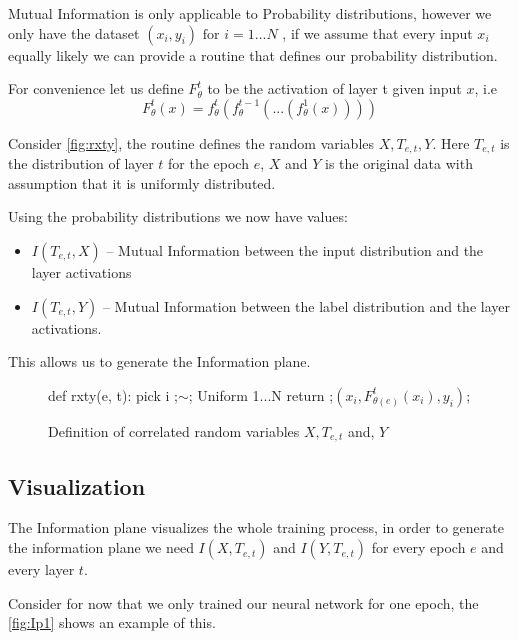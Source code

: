\documentclass[dissertation.tex]{subfiles}
\begin{document}
Mutual Information is only applicable to Probability distributions, however we
only have the dataset $(x_i, y_i) \text{ for } i = 1...N$ , if we assume that
every input $x_i$ equally likely we can provide a routine that defines our
probability distribution.

For convenience let us define $F_{\theta}^t$ to be the activation of layer t given
input $x$, i.e
\begin{equation}
  F_{\theta}^t(x) = f_{\theta}^t(f_{\theta}^{t-1}(...(f_{\theta}^1(x))))
  \label{eq:bigF}
\end{equation}


Consider \autoref{fig:rxty}, the routine defines the random variables
$X,T_{e,t},Y$. Here $T_{e,t}$ is the distribution of layer $t$ for the epoch $e$,
$X$ and $Y$ is the original data with assumption that it is uniformly
distributed. 

Using the probability distributions we now have values:
\begin{itemize}
  \item{
      $I(T_{e,t}, X)$ -- Mutual Information between the input distribution and the
      layer activations 
    }
  \item{
      $I(T_{e,t}, Y)$ -- Mutual Information between the label distribution and the
      layer activations.
    }
\end{itemize}
This allows us to generate the Information plane.


\begin{figure}[H]
    \begin{pythonfigure}
      def rxty(e, t):
        pick i ;$\sim$; Uniform {1...N}
        return ;$(x_i, F_{\theta(e)}^t(x_i), y_i)$;
    \end{pythonfigure}
    \caption{Definition of correlated random variables $X, T_{e,t}$ and, $Y$}
    \label{fig:rxty}
\end{figure}

\subsection{Visualization}

The Information plane visualizes the whole training process, in order to
generate the information plane we need $I(X,T_{e,t})$ and $I(Y,T_{e,t})$ for every
epoch $e$ and every layer $t$.

Consider for now that we only trained our neural network for one epoch, the
\autoref{fig:Ip1} shows an example of this. 
\end{document}
